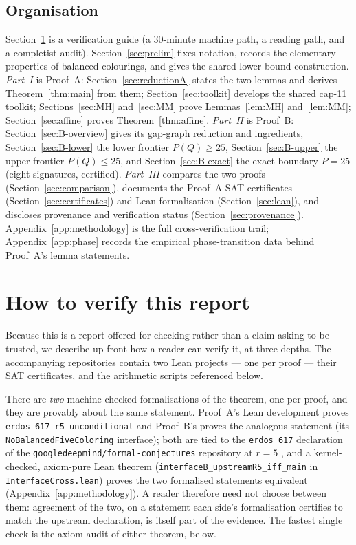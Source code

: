 \documentclass[11pt,reqno]{amsart}
\theoremstyle{definition}
\theoremstyle{remark}
\newcommand{\capeleven}{\textsf{cap-11}}
\begin{document}
\subsection{Organisation}
Section~\ref{sec:howto} is a verification guide (a $30$-minute machine path, a reading
path, and a completist audit). Section~\ref{sec:prelim} fixes notation, records the
elementary properties of balanced colourings, and gives the shared lower-bound
construction. \emph{Part~I} is Proof~A: Section~\ref{sec:reductionA} states the two
lemmas and derives Theorem~\ref{thm:main} from them; Section~\ref{sec:toolkit} develops
the shared \capeleven{} toolkit; Sections~\ref{sec:MH} and~\ref{sec:MM} prove
Lemmas~\ref{lem:MH} and~\ref{lem:MM}; Section~\ref{sec:affine} proves
Theorem~\ref{thm:affine}. \emph{Part~II} is Proof~B: Section~\ref{sec:B-overview} gives
its gap-graph reduction and ingredients, Section~\ref{sec:B-lower} the lower frontier
$P(Q)\ge 25$, Section~\ref{sec:B-upper} the upper frontier $P(Q)\le 25$, and
Section~\ref{sec:B-exact} the exact boundary $P=25$ (eight signatures, certified).
\emph{Part~III} compares the two proofs (Section~\ref{sec:comparison}), documents the
Proof~A SAT certificates (Section~\ref{sec:certificates}) and Lean formalisation
(Section~\ref{sec:lean}), and discloses provenance and verification status
(Section~\ref{sec:provenance}). Appendix~\ref{app:methodology} is the full
cross-verification trail; Appendix~\ref{app:phase} records the empirical
phase-transition data behind Proof~A's lemma statements.

\section{How to verify this report}\label{sec:howto}

Because this is a report offered for checking rather than a claim asking to be
trusted, we describe up front how a reader can verify it, at three depths. The
accompanying repositories contain two Lean projects --- one per proof --- their SAT
certificates, and the arithmetic scripts referenced below.

There are \emph{two} machine-checked formalisations of the theorem, one per proof, and
they are provably about the same statement. Proof~A's Lean development proves
\texttt{erdos\_617\_r5\_unconditional} and Proof~B's proves the analogous statement (its
\texttt{NoBalancedFiveColoring} interface); both are tied to the \texttt{erdos\_617}
declaration of the \texttt{google\-deepmind/formal-conjectures} repository at $r=5$
\cite{FC}, and a kernel-checked, axiom-pure Lean theorem
(\texttt{interfaceB\_upstreamR5\_iff\_main} in \texttt{InterfaceCross.lean}) proves the
two formalised statements equivalent (Appendix~\ref{app:methodology}). A reader
therefore need not choose between them: agreement of the two, on a statement each
side's formalisation certifies to match the upstream declaration, is itself part of the
evidence. The fastest single check is the axiom audit of either theorem, below.
\end{document}
